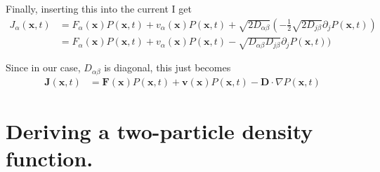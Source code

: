 \documentclass{article}
\begin{document}
Finally, inserting this into the current I get
\begin{align}
  J_{\alpha}(\bm{x},t)&=F_{\alpha}(\bm{x})P(\bm{x},t)+v_{\alpha}(\bm{x})P(\bm{x},t)
                        +\sqrt{2D_{\alpha\beta}}(-\frac{1}{2}\sqrt{2D_{j\beta}}
                        \partial_jP(\bm{x},t))\nonumber\\
                      &=F_{\alpha}(\bm{x})P(\bm{x},t)+v_{\alpha}(\bm{x})P(\bm{x},t)
                        -\sqrt{D_{\alpha\beta}D_{j\beta}}
                        \partial_jP(\bm{x},t))
\end{align}

Since in our case, $D_{\alpha\beta}$ is diagonal, this just becomes
\begin{align}
  \bm{J}(\bm{x},t)&=\bm{F}(\bm{x})P(\bm{x},t)+\bm{v}(\bm{x})P(\bm{x},t)
                    -\bm{D}\cdot\nabla P(\bm{x},t)
\end{align}

\section{Deriving a two-particle density function.}


                                  




\end{document}
